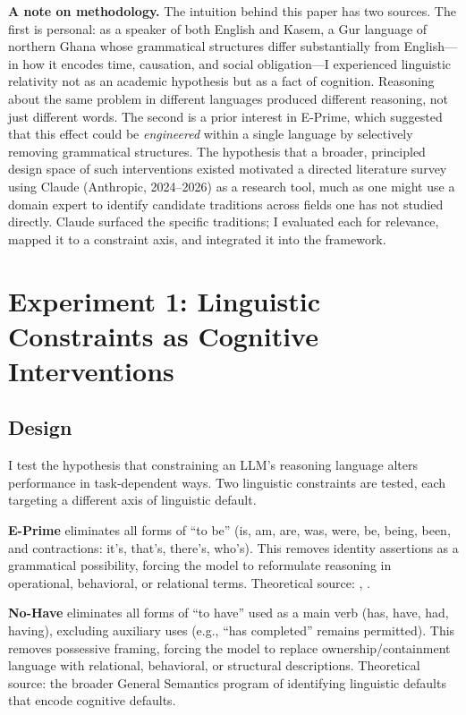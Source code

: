 \documentclass[11pt,a4paper]{article}
\begin{document}
\textbf{A note on methodology.} The intuition behind this paper has two sources. The first is personal: as a speaker of both English and Kasem, a Gur language of northern Ghana whose grammatical structures differ substantially from English---in how it encodes time, causation, and social obligation---I experienced linguistic relativity not as an academic hypothesis but as a fact of cognition. Reasoning about the same problem in different languages produced different reasoning, not just different words. The second is a prior interest in E-Prime, which suggested that this effect could be \emph{engineered} within a single language by selectively removing grammatical structures. The hypothesis that a broader, principled design space of such interventions existed motivated a directed literature survey using Claude (Anthropic, 2024--2026) as a research tool, much as one might use a domain expert to identify candidate traditions across fields one has not studied directly. Claude surfaced the specific traditions; I evaluated each for relevance, mapped it to a constraint axis, and integrated it into the framework.

\section{Experiment 1: Linguistic Constraints as Cognitive Interventions}

\subsection{Design}

I test the hypothesis that constraining an LLM's reasoning language alters performance in task-dependent ways. Two linguistic constraints are tested, each targeting a different axis of linguistic default.

\textbf{E-Prime} eliminates all forms of ``to be'' (is, am, are, was, were, be, being, been, and contractions: it's, that's, there's, who's). This removes identity assertions as a grammatical possibility, forcing the model to reformulate reasoning in operational, behavioral, or relational terms. Theoretical source: \citet{korzybski1933}, \citet{bourland1965}.

\textbf{No-Have} eliminates all forms of ``to have'' used as a main verb (has, have, had, having), excluding auxiliary uses (e.g., ``has completed'' remains permitted). This removes possessive framing, forcing the model to replace ownership/containment language with relational, behavioral, or structural descriptions. Theoretical source: the broader General Semantics program of identifying linguistic defaults that encode cognitive defaults.
\end{document}
